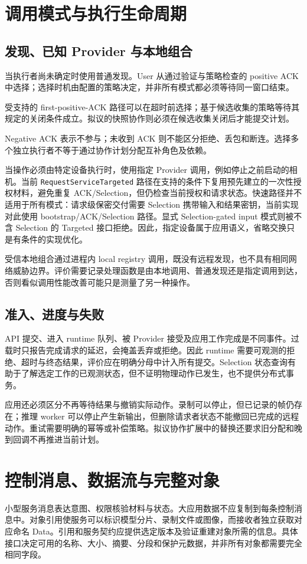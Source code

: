\section{调用模式与执行生命周期}
\subsection{发现、已知 Provider 与本地组合}
当执行者尚未确定时使用普通发现。User 从通过验证与策略检查的 positive ACK 中选择；选择时机由配置的策略决定，并非所有模式都必须等待同一窗口结束。

受支持的 first-positive-ACK 路径可以在超时前选择；基于候选收集的策略等待其规定的关闭条件成立。拟议的快照协作则必须在候选收集关闭后才能提交计划。

Negative ACK 表示不参与；未收到 ACK 则不能区分拒绝、丢包和断连。选择多个独立执行者不等于通过协作计划分配互补角色及依赖。

当操作必须由特定设备执行时，使用指定 Provider 调用，例如停止之前启动的相机。当前 \texttt{RequestServiceTargeted} 路径在支持的条件下复用预先建立的一次性授权材料，避免重复 ACK/Selection，但仍检查当前授权和请求状态。快速路径并不适用于所有模式：请求级保密交付需要 Selection 携带输入和结果密钥，当前实现对此使用 bootstrap/ACK/Selection 路径。显式 Selection-gated input 模式则被不含 Selection 的 Targeted 接口拒绝。因此，指定设备属于应用语义，省略交换只是有条件的实现优化。

受信本地组合通过进程内 local registry 调用，既没有远程发现，也不具有相同网络威胁边界。评价需要记录处理函数是由本地调用、普通发现还是指定调用到达，否则看似调用性能改善可能只是测量了另一种操作。

\subsection{准入、进度与失败}
API 提交、进入 runtime 队列、被 Provider 接受及应用工作完成是不同事件。过载时只报告完成请求的延迟，会掩盖丢弃或拒绝。因此 runtime 需要可观测的拒绝、超时与终态结果，评价应在明确分母中计入所有提交。Selection 状态查询有助于了解选定工作的已观测状态，但不证明物理动作已发生，也不提供分布式事务。

应用还必须区分不再等待结果与撤销实际动作。录制可以停止，但已记录的帧仍存在；推理 worker 可以停止产生新输出，但删除请求者状态不能撤回已完成的远程动作。重试需要明确的幂等或补偿策略。拟议协作扩展中的替换还要求旧分配和晚到回调不再推进当前计划。

\section{控制消息、数据流与完整对象}
小型服务消息表达意图、权限核验材料与状态。大应用数据不应复制到每条控制消息中。对象引用使服务可以标识模型分片、录制文件或图像，而接收者独立获取对应命名 Data。引用和服务契约应提供选定版本及验证重建对象所需的信息。具体接口决定可用的名称、大小、摘要、分段和保护元数据，并非所有对象都需要完全相同字段。

